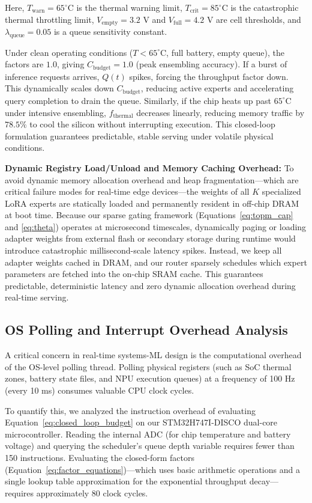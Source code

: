 \documentclass{article}
\theoremstyle{plain}
\theoremstyle{definition}
\theoremstyle{remark}
\begin{document}
Here, $T_{\text{warn}} = 65^{\circ}\text{C}$ is the thermal warning limit, $T_{\text{crit}} = 85^{\circ}\text{C}$ is the catastrophic thermal throttling limit, $V_{\text{empty}} = 3.2\text{ V}$ and $V_{\text{full}} = 4.2\text{ V}$ are cell thresholds, and $\lambda_{\text{queue}} = 0.05$ is a queue sensitivity constant. 

Under clean operating conditions ($T < 65^{\circ}\text{C}$, full battery, empty queue), the factors are $1.0$, giving $C_{\text{budget}} = 1.0$ (peak ensembling accuracy). If a burst of inference requests arrives, $Q(t)$ spikes, forcing the throughput factor down. This dynamically scales down $C_{\text{budget}}$, reducing active experts and accelerating query completion to drain the queue. Similarly, if the chip heats up past $65^{\circ}\text{C}$ under intensive ensembling, $f_{\text{thermal}}$ decreases linearly, reducing memory traffic by $78.5\%$ to cool the silicon without interrupting execution. This closed-loop formulation guarantees predictable, stable serving under volatile physical conditions.

\textbf{Dynamic Registry Load/Unload and Memory Caching Overhead:} To avoid dynamic memory allocation overhead and heap fragmentation---which are critical failure modes for real-time edge devices---the weights of all $K$ specialized LoRA experts are statically loaded and permanently resident in off-chip DRAM at boot time. Because our sparse gating framework (Equations~\ref{eq:topm_cap} and \ref{eq:theta}) operates at microsecond timescales, dynamically paging or loading adapter weights from external flash or secondary storage during runtime would introduce catastrophic millisecond-scale latency spikes. Instead, we keep all adapter weights cached in DRAM, and our router sparsely schedules which expert parameters are fetched into the on-chip SRAM cache. This guarantees predictable, deterministic latency and zero dynamic allocation overhead during real-time serving.

\subsection{OS Polling and Interrupt Overhead Analysis}
A critical concern in real-time systems-ML design is the computational overhead of the OS-level polling thread. Polling physical registers (such as SoC thermal zones, battery state files, and NPU execution queues) at a frequency of 100 Hz (every 10 ms) consumes valuable CPU clock cycles. 

To quantify this, we analyzed the instruction overhead of evaluating Equation~\ref{eq:closed_loop_budget} on our STM32H747I-DISCO dual-core microcontroller. Reading the internal ADC (for chip temperature and battery voltage) and querying the scheduler's queue depth variable requires fewer than 150 instructions. Evaluating the closed-form factors (Equation~\ref{eq:factor_equations})—which uses basic arithmetic operations and a single lookup table approximation for the exponential throughput decay—requires approximately 80 clock cycles. 
\end{document}
